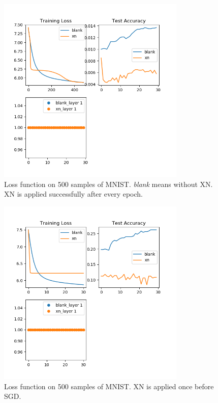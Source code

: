 \begin{enumerate}
	\begin{figure}[H]
		\center
		\includegraphics*[width=0.8\textwidth]{./figures/XNv2_mnist500.png}
		\caption{Loss function on 500 samples of MNIST. \emph{blank} means without XN. XN is applied successfully after every epoch.}
		\label{XNv2_Points}
	\end{figure}

	\begin{figure}[H]
		\center
		\includegraphics*[width=0.8\textwidth]{./figures/XNv2_mnist500_XN0.png}
		\caption{Loss function on 500 samples of MNIST. XN is applied once before SGD.}
		\label{XNv2_Points}
	\end{figure}
	
\end{enumerate}

